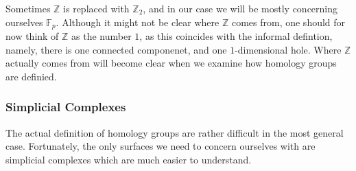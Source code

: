 \documentclass[letterpaper,12pt]{article}
\begin{document}
Sometimes $\mathbb{Z}$ is replaced with $\mathbb{Z}_2$, and in our case we will be mostly concerning ourselves $\mathbb{F}_p$. Although it might not be clear where $\mathbb{Z}$ comes from, one should for now think of $\mathbb{Z}$ as the number $1$, as this coincides with the informal defintion, namely, there is one connected componenet, and one $1$-dimensional hole. Where $\mathbb{Z}$ actually comes from will become clear when we examine how homology groups are definied.

\subsubsection{Simplicial Complexes}

The actual definition of homology groups are rather difficult in the most general case. Fortunately, the only surfaces we need to concern ourselves with are simplicial complexes which are much easier to understand.
\end{document}

